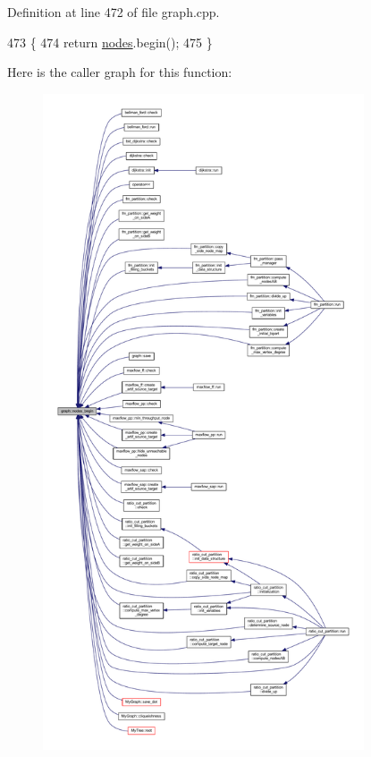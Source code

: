 Definition at line 472 of file graph.\+cpp.


\begin{DoxyCode}
473 \{
474     \textcolor{keywordflow}{return} \mbox{\hyperlink{classgraph_a4ea0592e8eb7c26c5abad24546907726}{nodes}}.begin();
475 \}
\end{DoxyCode}
Here is the caller graph for this function\+:
\nopagebreak
\begin{figure}[H]
\begin{center}
\leavevmode
\includegraphics[height=550pt]{classgraph_aec053a4b509d1be804237a80044c54c0_icgraph}
\end{center}
\end{figure}
\mbox{\label{classgraph_abbf9c0cb5629e98e1142254911238173}} 
